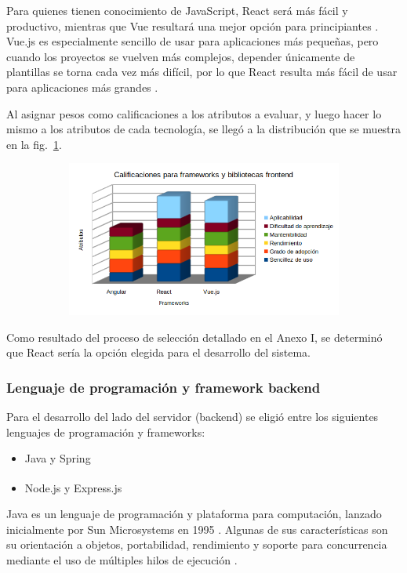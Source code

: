 \documentclass[twoside]{article}
\begin{document}
Para quienes tienen conocimiento de JavaScript, React será más fácil y productivo, mientras que Vue resultará una mejor opción para principiantes \parencite{digitalya}. Vue.js es especialmente sencillo de usar para aplicaciones más pequeñas, pero cuando los proyectos se vuelven más complejos, depender únicamente de plantillas se torna cada vez más difícil, por lo que React resulta más fácil de usar para aplicaciones más grandes \parencite{stxnext}.

Al asignar pesos como calificaciones a los atributos a evaluar, y luego hacer lo mismo a los atributos de cada tecnología, se llegó a la distribución que se muestra en la fig.~\ref{fig:frameworksFrontend}.
\begin{figure}[H]
	\caption{Gráfico de calificaciones para frameworks y bibliotecas frontend}
    \begin{subfigure}{1\textwidth}
	\includegraphics[width=1\textwidth]{calificaciones para frameworks frontend.png}
    \end{subfigure}
	\label{fig:frameworksFrontend}
\end{figure}
\vspace{-1.0\baselineskip}
Como resultado del proceso de selección detallado en el Anexo I, se determinó que React sería la opción elegida para el desarrollo del sistema.
\subsubsection{Lenguaje de programación y framework backend}
Para el desarrollo del lado del servidor (backend) se eligió entre los siguientes lenguajes de programación y frameworks:
\begin{itemize}
    \item Java y Spring
    \item Node.js\textsuperscript{\textregistered} y Express.js
\end{itemize}
Java es un lenguaje de programación y plataforma para computación, lanzado inicialmente por Sun Microsystems en 1995 \parencite{whatIsJava}. Algunas de sus características son su orientación a objetos, portabilidad, rendimiento y soporte para concurrencia mediante el uso de múltiples hilos de ejecución \parencite{featuresJava}.
\end{document}
